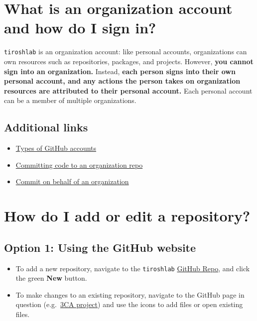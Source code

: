 \documentclass[
]{book}
\providecommand{\tightlist}{%
  \setlength{\itemsep}{0pt}\setlength{\parskip}{0pt}}
\begin{document}
\hypertarget{what-is-an-organization-account-and-how-do-i-sign-in}{%
\section{What is an organization account and how do I sign in?}\label{what-is-an-organization-account-and-how-do-i-sign-in}}

\texttt{tiroshlab} is an organization account: like personal accounts, organizations can own resources such as repositories, packages, and projects. However, \textbf{you cannot sign into an organization.} Instead, \textbf{each person signs into their own personal account, and any actions the person takes on organization resources are attributed to their personal account.} Each personal account can be a member of multiple organizations.

\hypertarget{additional-links-1}{%
\subsection{Additional links}\label{additional-links-1}}

\begin{itemize}
\tightlist
\item
  \href{https://docs.github.com/en/get-started/learning-about-github/types-of-github-accounts}{Types of GitHub accounts}
\item
  \href{https://stackoverflow.com/questions/35745358/can-a-github-organization-commit-code-to-a-repository}{Committing code to an organization repo}
\item
  \href{Creating\%20a\%20commit\%20on\%20behalf\%20of\%20an\%20organization}{Commit on behalf of an organization}
\end{itemize}

\hypertarget{how-do-i-add-or-edit-a-repository}{%
\section{How do I add or edit a repository?}\label{how-do-i-add-or-edit-a-repository}}

\hypertarget{option-1-using-the-github-website}{%
\subsection{Option 1: Using the GitHub website}\label{option-1-using-the-github-website}}

\begin{itemize}
\tightlist
\item
  To add a new repository, navigate to the \texttt{tiroshlab} \href{https://github.com/tiroshlab}{GitHub Repo}, and click the green \textbf{New} button.
\item
  To make changes to an existing repository, navigate to the GitHub page in question (e.g.~\href{https://github.com/tiroshlab/3ca}{3CA project}) and use the icons to add files or open existing files.
\end{itemize}
\end{document}
